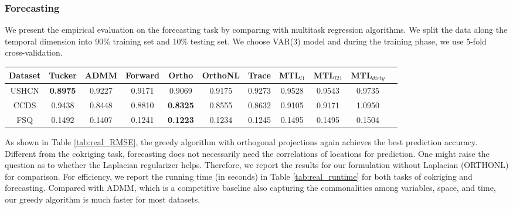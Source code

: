
\subsubsection{Forecasting}
We present the empirical evaluation on the forecasting task by comparing with multitask regression algorithms.  We split the data along the temporal dimension into 90\% training set and 10\% testing set. We choose VAR(3) model and during the training phase, we use 5-fold cross-validation.%

\begin{table*}[t]
\caption{ Forecasting NRMSE for VAR process with 3 lags, trained with 90\%  of the time series.} %
\small
\label{tab:real_RMSE}
\begin{center}
\begin{tiny}
\begin{sc}
\centering  \footnotesize%
\begin{tabular}{@{}c@{\;\;} c @{\;\;} c @{\;\;}c @{\;\;}c@{\;\;} c @{\;\;}c@{\;\;} c @{\;\;}c @{\;\;}c @{\;\;}c@{}} %
\hline
Dataset  & Tucker  & ADMM & Forward & Ortho & OrthoNL& Trace  & MTL$_{l1}$ & MTL$_{l21}$ & MTL$_{dirty}$  \\
\hline
USHCN  & \textbf{0.8975} & 0.9227& 0.9171& 0.9069 & 0.9175 & 0.9273& 0.9528   & 0.9543 &  0.9735  \\
CCDS & 0.9438 & 0.8448 & 0.8810& \textbf{0.8325} &0.8555 &0.8632 & 0.9105& 0.9171& 1.0950 \\
FSQ  & 0.1492 & 0.1407& 0.1241& \textbf{0.1223} & 0.1234 &0.1245 &  0.1495 &  0.1495   & 0.1504  \\
\hline
\end{tabular}
\end{sc}
\end{tiny}
\end{center}
\vspace{-0.25in}
\end{table*}


As shown in Table \ref{tab:real_RMSE}, the greedy algorithm with orthogonal projections again achieves the best prediction accuracy. Different from the cokriging task, forecasting does not necessarily need the correlations of locations for prediction. One might raise the question as to whether the Laplacian regularizer helps. Therefore, we report the results for our formulation without Laplacian (ORTHONL) for comparison.  For efficiency, we report the running time (in seconds) in Table \ref{tab:real_runtime} for both tasks of cokriging and forecasting.  Compared with ADMM, which is a competitive baseline also capturing the commonalities among variables, space, and time, our greedy algorithm is much faster for most datasets.

